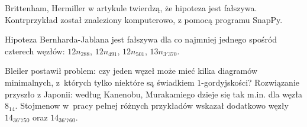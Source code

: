 Brittenham, Hermiller w artykule \cite{brittenham2021} twierdzą, że hipoteza jest fałszywa.
Kontrprzykład został znaleziony komputerowo, z pomocą programu SnapPy.
%
%
%

\begin{example}
%
%
%
%
    Hipoteza Bernharda-Jablana jest fałszywa dla co najmniej jednego spośród czterech węzłów: $12n_{288}$, $12n_{491}$, $12n_{501}$, $13n_{3'370}$.
\end{example}

Bleiler \cite{bleiler1984} postawił problem: czy jeden węzeł może mieć kilka diagramów minimalnych, z~których tylko niektóre są świadkiem $1$-gordyjskości?
Rozwiązanie przyszło z Japonii: według Kanenobu, Murakamiego \cite{kanenobumurakami1986} dzieje się tak m.in. dla węzła $8_{14}$.
%
%
%
Stojmenow w~pracy \cite{stoimenow2001} pełnej różnych przykładów wskazał dodatkowo węzły $14_{36'750}$ oraz $14_{36'760}$.
%
%
%

